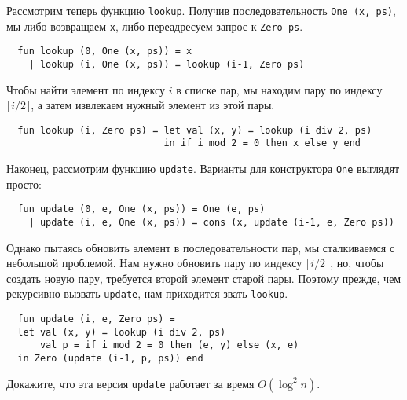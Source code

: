 Рассмотрим теперь функцию \lstinline!lookup!. Получив
последовательность \lstinline!One (x, ps)!, мы либо возвращаем
\lstinline!x!, либо переадресуем запрос к \lstinline!Zero ps!.
\begin{lstlisting}
  fun lookup (0, One (x, ps)) = x
    | lookup (i, One (x, ps)) = lookup (i-1, Zero ps)
\end{lstlisting}
Чтобы найти элемент по индексу $i$ в списке пар, мы находим пару по
индексу $\lfloor i/2 \rfloor$, а затем извлекаем нужный элемент из
этой пары.
\begin{lstlisting}
  fun lookup (i, Zero ps) = let val (x, y) = lookup (i div 2, ps)
                            in if i mod 2 = 0 then x else y end
\end{lstlisting}

Наконец, рассмотрим функцию \lstinline!update!. Варианты для
конструктора \lstinline!One! выглядят просто:
\begin{lstlisting}
  fun update (0, e, One (x, ps)) = One (e, ps)
    | update (i, e, One (x, ps)) = cons (x, update (i-1, e, Zero ps))
\end{lstlisting}
Однако пытаясь обновить элемент в последовательности пар, мы
сталкиваемся с небольшой проблемой. Нам нужно обновить пару по индексу
$\lfloor i/2 \rfloor$, но, чтобы создать новую пару, требуется второй
элемент старой пары. Поэтому прежде, чем рекурсивно вызвать
\lstinline!update!, нам приходится звать \lstinline!lookup!.
\begin{lstlisting}
  fun update (i, e, Zero ps) =
  let val (x, y) = lookup (i div 2, ps)
      val p = if i mod 2 = 0 then (e, y) else (x, e)
  in Zero (update (i-1, p, ps)) end
\end{lstlisting}

\begin{exercise}\label{ex:10.1}
  Докажите, что эта версия \lstinline!update! работает за время
  $O(\log^2 n)$.
\end{exercise}

